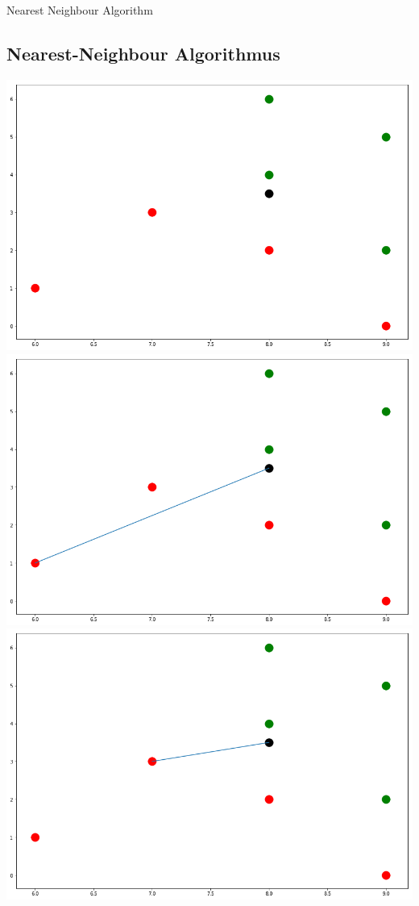 \documentclass[a4paper]{scrartcl}
\begin{document}
\begin{multicols}{2}
\begin{algorithm}[H]
                            \caption{Nearest Neighbour Algorithm}
                           \end{algorithm}
                        \subsection{Nearest-Neighbour Algorithmus}
                        \includegraphics[width=\linewidth]{nn1.png}
                        \includegraphics[width=\linewidth]{nn2.png}
                        \includegraphics[width=\linewidth]{nn3.png}

\end{multicols}
\end{document}
